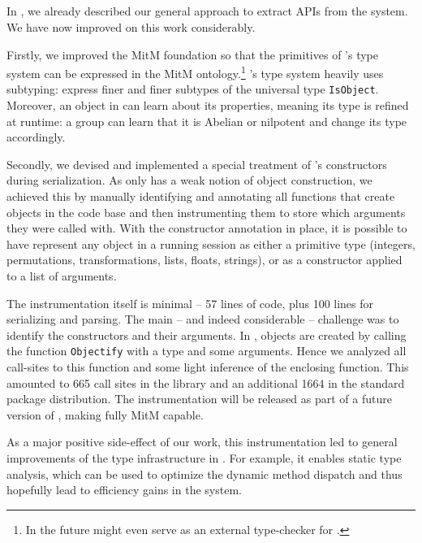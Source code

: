\subsection{\GAP}

In \cite{DehKohKon:iop16}, we already described our general approach to extract APIs from the \GAP system.
We have now improved on this work considerably.

Firstly, we improved the MitM foundation so that the primitives of \GAP's type system can be expressed in the MitM ontology.\footnote{In the future \MMT might even serve as an   external type-checker for \GAP.}  \GAP's type system heavily uses subtyping:  express finer and finer subtypes of the universal type \lstinline|IsObject|.  
Moreover, an object in \GAP can learn about its properties, meaning its type is refined at runtime: a group can learn that it is Abelian or nilpotent and change its type accordingly.

Secondly, we devised and implemented a special treatment of \GAP's constructors during serialization.
As \GAP only has a weak notion of object construction, we achieved this by manually identifying and annotating all functions that create objects in the \GAP code base and then instrumenting them to store which arguments they were called with.
With the constructor annotation in place, it is possible to have \GAP represent any object in a running session as either a primitive type (integers, permutations, transformations, lists, floats, strings), or as a constructor applied to a list of arguments.

The instrumentation itself is minimal -- 57 lines of \GAP code, plus 100 lines for serializing and parsing.
The main -- and indeed considerable -- challenge was to identify the constructors and their arguments.
In \GAP, objects are created by calling the function \lstinline|Objectify| with a type and some arguments.
Hence we analyzed
all call-sites to this function and some light inference of the enclosing function.
This amounted to 665 call sites in the \GAP library and an additional 1664 in the standard package distribution.
The instrumentation will be released as part of a future version of \GAP, making \GAP fully MitM capable.

As a major positive side-effect of our work, this instrumentation led to general improvements of the type infrastructure in \GAP.
For example, it enables static type analysis, which can be used to optimize the dynamic method dispatch and thus hopefully lead to efficiency gains in the system.

